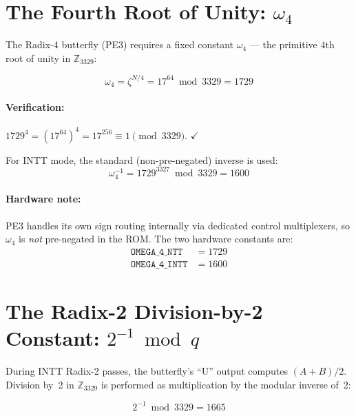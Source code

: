 \documentclass[11pt,a4paper]{article}
\newcommand{\Zq}{\mathbb{Z}_{3329}}
\begin{document}
\section{The Fourth Root of Unity: $\omega_4$}
\label{sec:omega4}

The Radix-4 butterfly (PE3) requires a fixed constant $\omega_4$ --- the primitive 4th root of unity in $\Zq$:

\begin{equation}
  \omega_4 = \zeta^{N/4} = 17^{64} \bmod 3329 = 1729
  \label{eq:omega4}
\end{equation}

\paragraph{Verification:} $1729^4 = (17^{64})^4 = 17^{256} \equiv 1 \pmod{3329}$. $\checkmark$

For INTT mode, the standard (non-pre-negated) inverse is used:
\begin{equation}
  \omega_4^{-1} = 1729^{3327} \bmod 3329 = 1600
\end{equation}

\paragraph{Hardware note:} PE3 handles its own sign routing internally via dedicated control multiplexers, so $\omega_4$ is \emph{not} pre-negated in the ROM. The two hardware constants are:
\begin{align}
  \texttt{OMEGA\_4\_NTT}  &= 1729 \\
  \texttt{OMEGA\_4\_INTT} &= 1600
\end{align}

\section{The Radix-2 Division-by-2 Constant: $2^{-1} \bmod q$}
\label{sec:inv2}

During INTT Radix-2 passes, the butterfly's ``U'' output computes $(A + B)/2$. Division by~2 in $\Zq$ is performed as multiplication by the modular inverse of~2:

\begin{equation}
  2^{-1} \bmod 3329 = 1665
  \label{eq:inv2}
\end{equation}
\end{document}
